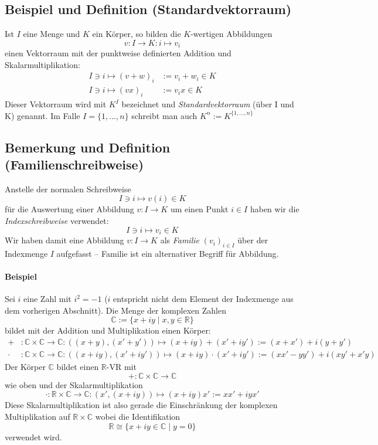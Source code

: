 \subsection{Beispiel und Definition (Standardvektorraum)}
	\begin{Definition}[Standardvektorraum]
		Ist $ I $ eine Menge und $ K $ ein Körper, so bilden die $ K $-wertigen Abbildungen
		\[ v: I \to K: i \mapsto v_i \]
	einen Vektorraum mit der punktweise definierten Addition und Skalarmultiplikation:
	\begin{align*}
		I\ni i \mapsto (v+w)_i &:= v_i+w_i\in K\\
		I\ni i \mapsto (vx)_i &:= v_ix \in K
	\end{align*}
	Dieser Vektorraum wird mit $K^{I}$ bezeichnet und \emph{Standardvektorraum} (über I und K) genannt. Im Falle $ I=\{1,...,n\} $ schreibt man auch $K^{n} := K^{\{1,...,n\}}$
	\end{Definition}

\subsection{Bemerkung und Definition (Familienschreibweise)}
	\begin{Definition}
		Anstelle der normalen Schreibweise
		\[ I\ni i \mapsto v(i) \in K \]
	für die Auswertung einer Abbildung  $v: I \to K$ um einen Punkt $i\in I$ haben wir die \emph{Indexschreibweise} verwendet:	
		\[ I\ni i \mapsto v_i \in K \]
	Wir haben damit eine Abbildung $v: I \to K$ als \emph{Familie} $ (v_i)_{i\in I} $ über der Indexmenge $ I $ aufgefasst -- Familie ist ein \glqq alternativer\grqq{} Begriff für Abbildung.
	\end{Definition}
	
\paragraph{Beispiel}
	Sei $i$ eine \glqq Zahl\grqq{} mit $i^2=-1$ ($i$ entspricht nicht dem Element der Indexmenge aus dem vorherigen Abschnitt). Die Menge der komplexen Zahlen
		\[ \mathbb{C}:=\{{x+iy\mid x,y\in \mathbb{R}}\} \]
	bildet mit der Addition und Multiplikation einen Körper:
	\begin{align*}
		+&:\mathbb{C}\times \mathbb{C} \to \mathbb{C}: ((x+y),(x'+y')) \mapsto (x+iy)+(x'+iy') := (x+x')+i(y+y')\\
		\cdot &:\mathbb{C}\times \mathbb{C} \to \mathbb{C}: ((x+iy),(x'+iy'))\mapsto (x+iy)\cdot (x'+iy') :=(xx'-yy')+i(xy'+x'y)
	\end{align*}
	Der Körper $\mathbb{C}$ bildet einen $\mathbb{R}$-VR mit
		\[ +:\mathbb{C}\times\mathbb{C}\to\mathbb{C} \]
	wie oben und der Skalarmultiplikation
		\[ \cdot:\mathbb{R}\times\mathbb{C}\to\mathbb{C}:(x',(x+iy))\mapsto(x+iy)x':=xx'+iyx' \]
	Diese Skalarmultiplikation ist also gerade die Einschränkung der komplexen Multiplikation auf $\mathbb{R}\times\mathbb{C}$ wobei die Identifikation
		\[ \mathbb{R}\cong \{{x+iy\in\mathbb{C}\mid y=0}\} \]
	verwendet wird.
	
